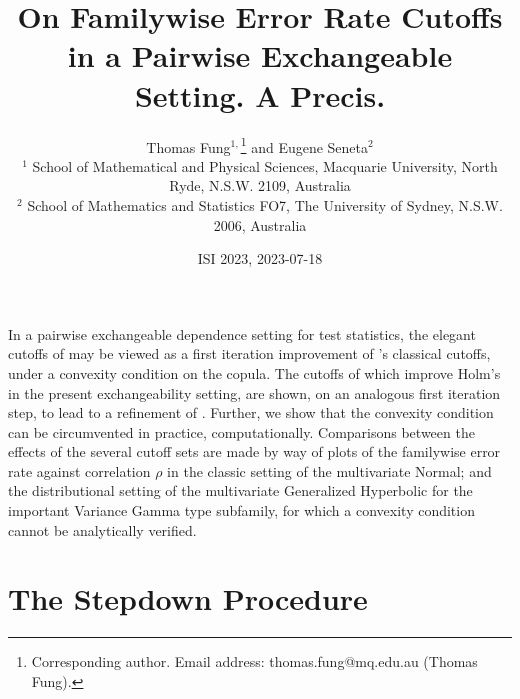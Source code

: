 \documentclass[12pt,fleqn] {article}
\begin{document}
\title{On Familywise Error Rate Cutoffs in a Pairwise Exchangeable Setting. A Precis.}

\author{Thomas Fung$^{1,}$\footnote{Corresponding author. Email address: thomas.fung@mq.edu.au (Thomas Fung).} and Eugene Seneta$^{2}$ \\ {\small $^{1}$
School of Mathematical and Physical Sciences, Macquarie University, North Ryde, N.S.W. 2109, Australia} \\
{\small $^{2}$
School of Mathematics and Statistics FO7, The University of Sydney, N.S.W. 2006, Australia}}
\date{ISI 2023, 2023-07-18}

\maketitle

\noindent In a pairwise exchangeable dependence setting for test statistics, the elegant cutoffs of \cite{sarkarImprovingHolmProcedure2016} may be viewed as a first iteration improvement of  \cite{holmSimpleSequentiallyRejective1979}'s classical cutoffs, under a convexity condition on the copula. The cutoffs of \cite{senetaSequentiallyRejectiveTest1997} which improve Holm's in the present exchangeability setting, are shown, on an  analogous first iteration step, to lead  to a refinement of \cite{sarkarImprovingHolmProcedure2016}. Further, we show that the convexity condition can be circumvented in practice, computationally. Comparisons between the  effects of the several cutoff sets are made by way of plots of the familywise error rate against correlation $\rho$ in the classic setting of the multivariate Normal; and the distributional setting of the multivariate Generalized Hyperbolic for the important Variance Gamma type subfamily, for which a convexity condition cannot be analytically verified.



\section{The Stepdown Procedure}
\end{document}

